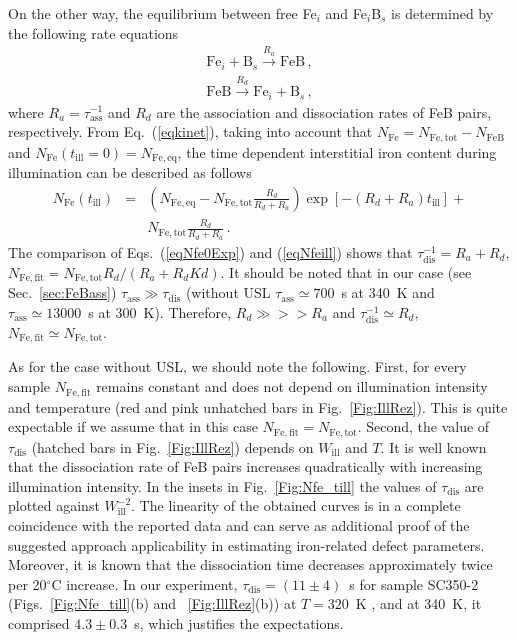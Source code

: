\documentclass[%
 aip,jap,
 amsmath,amssymb,
 reprint,%
]{revtex4-1}
\begin{document}
On the other way,
the equilibrium between free Fe$_i$ and Fe$_i$B$_s$ is determined by the following rate equations
\begin{eqnarray}
\label{eqkinet}
\mathrm{Fe}_i+\mathrm{B}_s\xrightarrow{R_a}\mathrm{FeB}\,,\nonumber\\
\mathrm{FeB}\xrightarrow{R_d}\mathrm{Fe}_i+\mathrm{B}_s\,,
\end{eqnarray}
where
$R_a=\tau_\mathrm{ass}^{-1}$ and
$R_d$ are the association and dissociation rates of FeB pairs, respectively.
From Eq.~(\ref{eqkinet}), taking into account that
$N_\mathrm{Fe}=N_\mathrm{Fe,tot}-N_\mathrm{FeB}$
and
$N_\mathrm{Fe}(t_\mathrm{ill}=0)=N_\mathrm{Fe,eq}$,
the time dependent interstitial iron content during illumination can be described as follows
\begin{eqnarray}
\label{eqNfeill}
N_\mathrm{Fe}(t_\mathrm{ill})&=&\left(N_\mathrm{Fe,eq}-N_\mathrm{Fe,tot}
\frac{R_d}{R_d+R_a}\right)\exp[-(R_d+R_a)t_\mathrm{ill}]+\nonumber\\
&&N_\mathrm{Fe,tot}\frac{R_d}{R_d+R_a}\,.
\end{eqnarray}
The comparison of Eqs.~(\ref{eqNfe0Exp}) and (\ref{eqNfeill}) shows that
$\tau_\mathrm{dis}^{-1}=R_a+R_d$,
$N_\mathrm{Fe,fit}=N_\mathrm{Fe,tot}R_d/(R_a+R_dKd)$.
It should be noted that in our case
(see Sec.~\ref{sec:FeBass}) $\tau_\mathrm{ass}\gg \tau_\mathrm{dis}$
(without USL $\tau_\mathrm{ass}\simeq700$~s at 340~K and $\tau_\mathrm{ass}\simeq13000$~s at 300~K). Therefore, $R_d\gg>>R_a$ and $\tau_\mathrm{dis}^{-1}\simeq R_d$,
$N_\mathrm{Fe,fit}\simeq N_\mathrm{Fe,tot}$.

As for the case without USL, we should note the following.
First, for every sample $N_\mathrm{Fe,fit}$ remains constant and does not depend on illumination intensity and temperature (red and pink unhatched bars in Fig.~\ref{Fig:IllRez}).
This is quite expectable if we assume that
in this case $N_\mathrm{Fe,fit}=N_\mathrm{Fe,tot}$.
Second, the value of $\tau_\mathrm{dis}$ (hatched bars in Fig.~\ref{Fig:IllRez})
depends on $W_\mathrm{ill}$ and $T$.
It is well known \cite{Schmidt2019,FeBLight2,FeBKin2019} that the dissociation rate of FeB pairs increases quadratically with increasing illumination intensity.
In the insets in Fig.~\ref{Fig:Nfe_till} the values of $\tau_\mathrm{dis}$
are plotted against $W_\mathrm{ill}^{-2}$.
The linearity of the obtained curves is in a complete coincidence
with the reported data and can serve as additional proof of the suggested approach
applicability in estimating iron-related defect parameters.
Moreover, it is known \cite{Lagowskii1993} that the dissociation time decreases approximately twice per 20$^\circ$C increase.
In our experiment, $\tau_\mathrm{dis}=(11\pm4)$~s for sample SC350-2
(Figs.~\ref{Fig:Nfe_till}(b) and ~\ref{Fig:IllRez}(b)) at $T=320$~K , and at 340~K,
it comprised $4.3\pm0.3$~s, which justifies the expectations.
\end{document}
